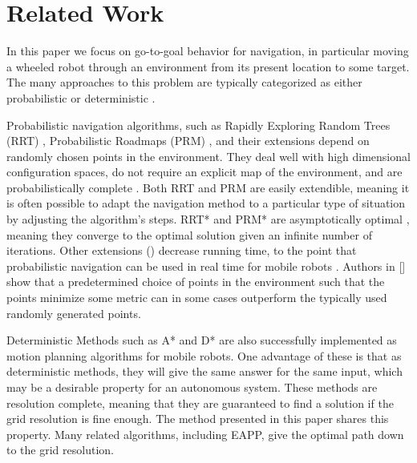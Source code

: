 \documentclass[journal]{IEEEtran}
\begin{document}
\section{Related Work}

In this paper we focus on go-to-goal behavior for navigation, in particular moving a wheeled robot through an environment from its present location to some target. 
The many approaches to this problem are typically categorized as either probabilistic or deterministic \cite{lavalle2006planning}. 

Probabilistic navigation algorithms, such as Rapidly Exploring Random Trees (RRT) \cite{lavalle1998rapidly}, Probabilistic Roadmaps (PRM) \cite{hsu1998finding}, and their extensions depend on randomly chosen points in the environment. 
They deal well with high dimensional configuration spaces, do not require an explicit map of the environment, and are probabilistically complete \cite{lavalle2006planning}. 
Both RRT and PRM are easily extendible, meaning it is often possible to adapt the navigation method to a particular type of situation by adjusting the algorithm's steps.
RRT* and PRM* are asymptotically optimal \cite{karaman2011sampling}, meaning they converge to the optimal solution given an infinite number of iterations.
Other extensions (\cite{kuffner2000rrt, urmson2003approaches}) decrease running time, to the point that probabilistic navigation can be used in real time for mobile robots \cite{bruce2002real}. 
Authors in [] show that a predetermined choice of points in the environment such that the points minimize some metric can in some cases outperform the typically used randomly generated points. 

Deterministic Methods such as A* \cite{hart1968formal} and D* \cite{koenig2005fast} are also successfully implemented as motion planning algorithms for mobile robots. 
One advantage of these is that as deterministic methods, they will give the same answer for the same input, which may be a desirable property for an autonomous system.
These methods are resolution complete, meaning that they are guaranteed to find a solution if the grid resolution is fine enough. 
The method presented in this paper shares this property. 
Many related algorithms, including EAPP, give the optimal path down to the grid resolution.
\end{document}
